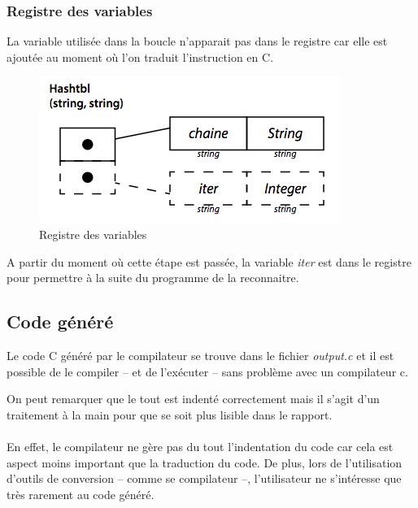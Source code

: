 \documentclass{article}
\begin{document}
\subsubsection*{Registre des variables}
La variable utilisée dans la boucle n'apparait pas dans le registre car elle est ajoutée
au moment où l'on traduit l'instruction en C. 

\begin{figure}[h]
    \centering
    \includegraphics[scale=0.6]{resources/registre.png}
    \caption{Registre des variables}
\end{figure}

A partir du moment où cette étape est passée, 
la variable \emph{iter} est dans le registre pour permettre à la suite du programme de la
reconnaitre.

\subsection{Code généré}
Le code C généré par le compilateur se trouve dans le fichier \emph{output.c} et il est 
possible de le compiler -- et de l'exécuter -- sans problème avec un compilateur c.

\lstset{language=c,caption=Code c de l'exemple}


On peut remarquer que le tout est indenté correctement mais il s'agit d'un traitement à la main 
pour que se soit plus lisible dans le rapport. 
\\\\
En effet, le compilateur ne gère pas du tout 
l'indentation du code car cela est aspect moins important que la traduction du code. De plus,
lors de l'utilisation d'outils de conversion -- comme se compilateur --, l'utilisateur ne 
s'intéresse que très rarement au code généré.
\end{document}
